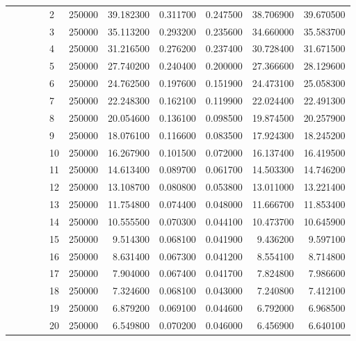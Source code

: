 \begin{tabular}{llllllrrrrr}
\cline{5-11}
 &  &  &  & 2 & 250000 & 39.182300 & 0.311700 & 0.247500 & 38.706900 & 39.670500 \\
\cline{5-11}
 &  &  &  & 3 & 250000 & 35.113200 & 0.293200 & 0.235600 & 34.660000 & 35.583700 \\
\cline{5-11}
 &  &  &  & 4 & 250000 & 31.216500 & 0.276200 & 0.237400 & 30.728400 & 31.671500 \\
\cline{5-11}
 &  &  &  & 5 & 250000 & 27.740200 & 0.240400 & 0.200000 & 27.366600 & 28.129600 \\
\cline{5-11}
 &  &  &  & 6 & 250000 & 24.762500 & 0.197600 & 0.151900 & 24.473100 & 25.058300 \\
\cline{5-11}
 &  &  &  & 7 & 250000 & 22.248300 & 0.162100 & 0.119900 & 22.024400 & 22.491300 \\
\cline{5-11}
 &  &  &  & 8 & 250000 & 20.054600 & 0.136100 & 0.098500 & 19.874500 & 20.257900 \\
\cline{5-11}
 &  &  &  & 9 & 250000 & 18.076100 & 0.116600 & 0.083500 & 17.924300 & 18.245200 \\
\cline{5-11}
 &  &  &  & 10 & 250000 & 16.267900 & 0.101500 & 0.072000 & 16.137400 & 16.419500 \\
\cline{5-11}
 &  &  &  & 11 & 250000 & 14.613400 & 0.089700 & 0.061700 & 14.503300 & 14.746200 \\
\cline{5-11}
 &  &  &  & 12 & 250000 & 13.108700 & 0.080800 & 0.053800 & 13.011000 & 13.221400 \\
\cline{5-11}
 &  &  &  & 13 & 250000 & 11.754800 & 0.074400 & 0.048000 & 11.666700 & 11.853400 \\
\cline{5-11}
 &  &  &  & 14 & 250000 & 10.555500 & 0.070300 & 0.044100 & 10.473700 & 10.645900 \\
\cline{5-11}
 &  &  &  & 15 & 250000 & 9.514300 & 0.068100 & 0.041900 & 9.436200 & 9.597100 \\
\cline{5-11}
 &  &  &  & 16 & 250000 & 8.631400 & 0.067300 & 0.041200 & 8.554100 & 8.714800 \\
\cline{5-11}
 &  &  &  & 17 & 250000 & 7.904000 & 0.067400 & 0.041700 & 7.824800 & 7.986600 \\
\cline{5-11}
 &  &  &  & 18 & 250000 & 7.324600 & 0.068100 & 0.043000 & 7.240800 & 7.412100 \\
\cline{5-11}
 &  &  &  & 19 & 250000 & 6.879200 & 0.069100 & 0.044600 & 6.792000 & 6.968500 \\
\cline{5-11}
 &  &  &  & 20 & 250000 & 6.549800 & 0.070200 & 0.046000 & 6.456900 & 6.640100 \\
\cline{5-11}

\end{tabular}
